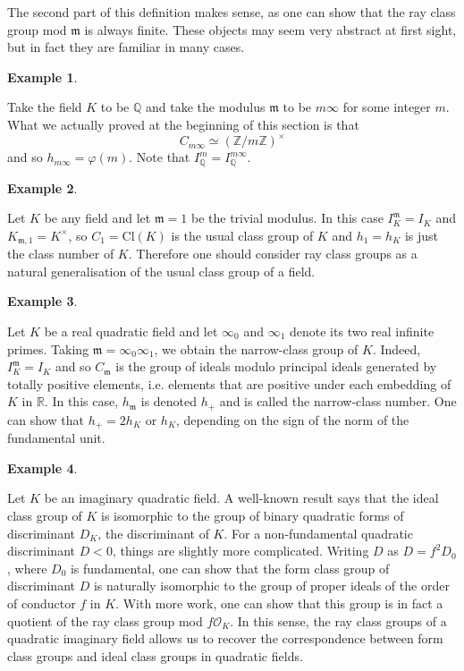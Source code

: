 \documentclass[]{amsart}
\newtheorem{ex}{Example}
\newcommand{\Z}{\mathbb{Z}}
\newcommand{\Q}{\mathbb{Q}}
\newcommand{\R}{\mathbb{R}}
\newcommand{\m}{\mathfrak{m}}
\newcommand{\IKm}{I^\mathfrak{m}_K}
\newcommand{\Kmo}{K_{\mathfrak{m},1}}
\newcommand{\OK}{\mathcal{O}_K}
\begin{document}
	The second part of this definition makes sense, as one can show that the ray class group mod $\m$ is always finite. These objects may seem very abstract at first sight, but in fact they are familiar in many cases.
	
	\clearpage
	\begin{ex}\end{ex} Take the field $K$ to be $\Q$ and take the modulus $\m$ to be $m\infty$ for some integer $m$. What we actually proved at the beginning of this section is that 
	\[C_{m\infty}\simeq (\Z/m\Z)^\times\]
	and so $h_{m\infty}=\varphi(m)$. Note that $I_\Q^{m}=I_\Q^{m\infty}$.
	
	\begin{ex}\end{ex} Let $K$ be any field and let $\m=1$ be the trivial modulus. In this case $\IKm=I_K$ and $\Kmo=K^\times$, so $C_1=\text{Cl}(K)$ is the usual class group of $K$ and $h_1=h_K$ is just the class number of $K$. Therefore one should consider ray class groups as a natural generalisation of the usual class group of a field.
	
	\begin{ex}\end{ex} Let $K$ be a real quadratic field and let $\infty_0$ and $\infty_1$ denote its two real infinite primes. Taking $\m=\infty_0\infty_1$, we obtain the narrow-class group of $K$. Indeed, $\IKm=I_K$ and so $C_\m$ is the group of ideals modulo principal ideals generated by totally positive elements, i.e. elements that are positive under each embedding of $K$ in $\R$. In this case, $h_\m$ is denoted $h_+$ and is called the narrow-class number. One can show that $h_+=2h_K$ or $h_K$, depending on the sign of the norm of the fundamental unit.
	
	\begin{ex}\end{ex} Let $K$ be an imaginary quadratic field. A well-known result says that the ideal class group of $K$ is isomorphic to the group of binary quadratic forms of discriminant $D_K$, the discriminant of $K$. For a non-fundamental quadratic discriminant $D<0$, things are slightly more complicated. Writing $D$ as $D=f^2D_0$, where $D_0$ is fundamental, one can show that the form class group of discriminant $D$ is naturally isomorphic to the group of proper ideals of the order of conductor $f$ in $K$. With more work, one can show that this group is in fact a quotient of the ray class group mod $f\OK$. In this sense, the ray class groups of a quadratic imaginary field allows us to recover the correspondence between form class groups and ideal class groups in quadratic fields.
	
\end{document}
